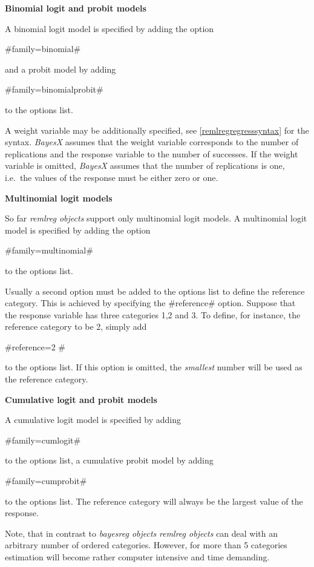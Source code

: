 {\bf Binomial logit and probit models}

A binomial logit model is specified by adding the option

#family=binomial#

and a probit model by adding

#family=binomialprobit#

to the options list.

A weight variable may be additionally specified, see
\autoref{remlregregresssyntax} for the syntax. {\em BayesX}
assumes that the weight variable corresponds to the number of
replications and the response variable to the number of successes.
If the weight variable is omitted, {\em BayesX} assumes that the
number of replications is one, i.e.~the values of the response
must be either zero or one.

{\bf Multinomial logit models}

So far {\em remlreg objects} support only multinomial logit
models. A multinomial logit model is specified by adding the
option

#family=multinomial#

to the options list.

Usually a second option must be added to the options list to
define the reference category. This is achieved by specifying the
#reference# option. Suppose that the response variable has three
categories 1,2 and 3. To define, for instance, the reference
category to be 2, simply add

#reference=2 #

to the options list. If this option is omitted, the {\em smallest}
number will be used as the reference category.

{\bf Cumulative logit and probit models}

A cumulative logit model is specified by adding

#family=cumlogit#

to the options list, a cumulative probit model by adding

#family=cumprobit#

to the options list. The reference category will always be the
largest value of the response.

Note, that in contrast to {\em bayesreg objects} {\em remlreg
objects} can deal with an arbitrary number of ordered categories.
However, for more than 5 categories estimation will become rather
computer intensive and time demanding.

\newpage

